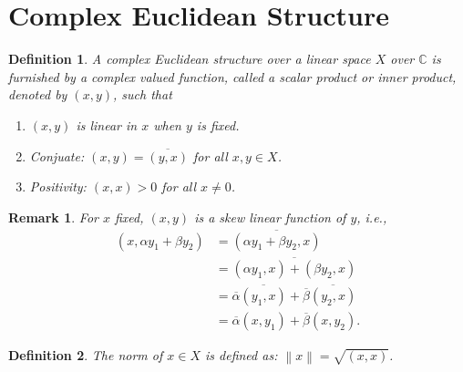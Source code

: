 \documentclass[11pt]{book}
\newtheorem{definition}{Definition}[chapter]
\newtheorem{remark}{Remark}[chapter]
\theoremstyle{definition}
\numberwithin{equation}{chapter}
\begin{document}
\medskip

\section{Complex Euclidean Structure}

\begin{definition}
A complex Euclidean structure over a linear space $X$ over $\mathbb{C}$ is furnished by a complex valued function, called a scalar product or inner product, denoted by $(x,y)$, such that
\begin{enumerate}[label=(\arabic*)]
    \item $(x,y)$ is linear in $x$ when $y$ is fixed.
    \item Conjuate: $(x,y) = \overline{(y,x)}$ for all $x,y\in X$.
    \item Positivity: $(x,x) > 0$ for all $x\neq 0$.
\end{enumerate}
\end{definition}
\begin{remark}
For $x$ fixed, $(x, y)$ is a skew linear function of $y$, i.e.,
\begin{align*}
    (x, \alpha y_1 + \beta y_2) & = \overline{(\alpha y_1 + \beta y_2,x)} \\
    & = \overline{(\alpha y_1,x) + (\beta y_2,x)} \\
    & = \overline{\alpha} \overline{(y_1,x)} + \overline{\beta} \overline{(y_2,x)} \\
    & = \overline{\alpha}(x, y_1) + \overline{\beta}(x, y_2).
\end{align*}
\end{remark}

\medskip

\begin{definition}
The norm of $x\in X$ is defined as: $\left\|x\right\| = \sqrt{(x,x)}$.
\end{definition}

\medskip
\end{document}
